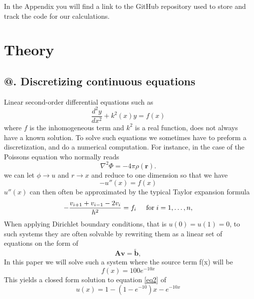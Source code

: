 \documentclass[%
reprint,
amsmath,amssymb,
aps,
]{revtex4-1}
\makeatletter
\newcommand*{\rom}[1]{\expandafter\@slowromancap\romannumeral #1@}
\makeatother
\begin{document}
In the Appendix you will find a link to the GitHub repository used to store and track the code for our calculations.
\newpage 

\section*{Theory}
\subsection*{\rom{1}. Discretizing continuous equations}
Linear second-order differential equations such as 
\begin{equation} \label{eq1}
\frac{d^2y}{dx^2}+k^2(x)y = f(x)
\end{equation}
where $f$ is the inhomogeneous term and $k^2$ is a real function, does not always have a known solution. To solve such equations we sometimes have to preform a discretization, and do a numerical computation. For instance, in the case of the Poissons equation who normally reads
\begin{equation*}
\nabla^2 \Phi = -4\pi \rho (\mathbf{r}).
\end{equation*}
we can let $\phi\rightarrow u$ and 
$r\rightarrow x$ and reduce to one dimension so that we have 
\begin{equation}
\label{eq2}
-u''(x) = f(x)
\end{equation}
$u''(x)$ can then often be approximated by the typical Taylor expansion formula
\begin{equation} \label{eq3}
-\frac{v_{i+1}+v_{i-1}-2v_i}{h^2} = f_i  \hspace{0.5cm} \mathrm{for} \hspace{0.1cm} i=1,\dots, n,
\end{equation}
When applying Dirichlet boundary conditions, that is $u(0) = u(1) = 0$, to such systems they are often solvable by rewriting them as a linear set of equations on the form of 
\begin{equation} \label{eq4}
\mathbf{A}\mathbf{v} = \tilde{\mathbf{b}},
\end{equation}
In this paper we will solve such a system where the source term f(x) will be 
\begin{equation} \label{eq5} 
f(x) = 100e^{-10x}
\end{equation}
This yields a closed form solution to equation \ref{eq2} of
\begin{equation} \label{eq6}
	u(x) = 1-(1-e^{-10})x-e^{-10x}
	\end{equation}
	
\end{document}
